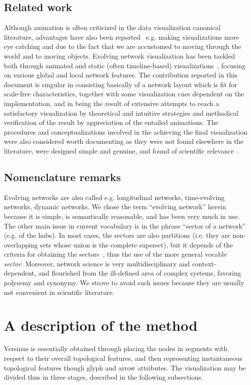 \documentclass[runningheads]{llncs}
\begin{document}
\subsection{Related work}
Although animation is often criticized in the data visualization canonical literature, advantages have also been reported~\cite{anim,munzner,cog,ware} e.g. making visualizations more eye catching and due to the fact that we are accustomed to moving through the world and to moving objects.
Evolving network visualization has been tackled both through animated and static (often timeline-based) visualizations~\cite{ego,brain,visAn}, focusing on various global and local network features.
The contribution reported in this document is singular in consisting basically of a network layout which is fit for scale-free characteristics, together with some visualization cues dependent on the implementation, and in being the result of extensive attempts to reach a satisfactory visualization by theoretical and intuitive strategies and methodical verification of the result by appreciation of the entailed animations.
The procedures and conceptualizations involved in the achieving the final visualization were also considered worth documenting as they were not found elsewhere in the literature, were designed simple and genuine, and found of scientific relevance~\cite{stab}.

\subsection{Nomenclature remarks}
Evolving networks are also called e.g. longitudinal networks, time-evolving networks, dynamic networks.
We chose the term ``evolving network'' herein because it is simple, is semantically reasonable, and has been very much in use.
The other main issue in current vocabulary is in the phrase ``sector of a network'' (e.g. of the hubs). In most cases, the sectors are also partitions (i.e. they are non-overlapping sets whose union is the complete superset), but it depends of the criteria for obtaining the sectors~\cite{stab}, thus the use of the more general vocable \emph{sector}.
Moreover, network science is very multidisciplinary and context-dependent, and flourished from the ill-defined area of complex systems, favoring polysemy and synonymy. We strove to avoid such issues because they are usually not convenient in scientific literature.

\section{A description of the method}\label{sec:des}
Versinus is essentially obtained through placing the nodes in segments
with respect to their overall topological features, and then representing
instantaneous topological features though glyph and arrow attributes.
The visualization may be divided thus in three stages, described in the following subsections.
\end{document}
